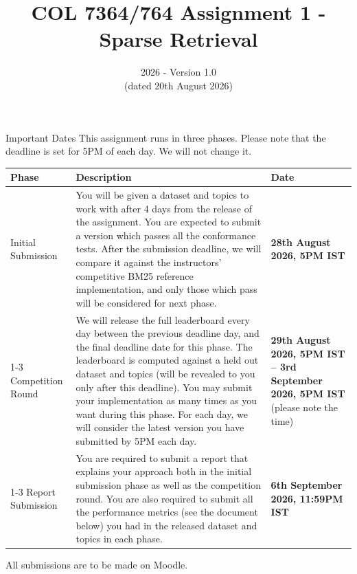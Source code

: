 \documentclass[10pt]{article}
\newcommand{\STARTDAY}{4\xspace}
\begin{document}
\title{COL 7364/764 Assignment 1 - Sparse Retrieval}
\date{2026 - Version 1.0 \\(dated 20th August 2026)}
\maketitle
\noindent
\begin{mybox}{Important Dates} 
This assignment runs in three phases. Please note that the deadline is set for 5PM of each day. We will not change it. 
\begin{center}
\begin{tabular}{l p{8cm} p{3cm} }
\toprule
\textbf{Phase} & \textbf{Description} & \textbf{Date} \\
\midrule
Initial Submission & You will be given a dataset and topics to work with after \STARTDAY days from the release of the assignment. You are expected to submit a version which passes all the conformance tests. After the submission deadline, we will compare it against the instructors' competitive BM25 reference implementation, and only those which pass will be considered for next phase. & \textbf{28th August 2026, 5PM IST} \\
\cmidrule(lr){1-3}
Competition Round & We will release the full leaderboard every day between the previous deadline day, and the final deadline date for this phase. The leaderboard is computed against a held out dataset and topics (will be revealed to you only after this deadline). You may submit your implementation as many times as you want during this phase. For each day, we will consider the latest version you have submitted by 5PM each day. & \textbf{29th August 2026, 5PM IST -- 3rd September 2026, 5PM IST} (please note the time) \\ 
\cmidrule(lr){1-3}
Report Submission & You are required to submit a report that explains your approach both in the initial submission phase as well as the competition round. You are also required to submit all the performance metrics (see the document below) you had in the released dataset and topics in each phase. &  \textbf{6th September 2026, 11:59PM IST} \\ 
\bottomrule
\end{tabular}
\end{center}

All submissions are to be made on Moodle. 
\end{mybox}
\end{document}
